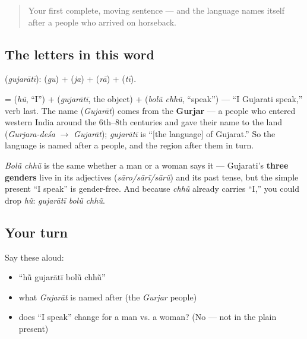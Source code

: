 \begin{quote}
Your first complete, moving sentence — and the language names itself after a people who arrived on horseback.
\end{quote}

\subsection*{The letters in this word}
\textbf{} (\emph{gujarātī}): \textbf{} (\emph{gu}) + \textbf{} (\emph{ja}) + \textbf{} (\emph{rā}) + \textbf{} (\emph{tī}).

\begin{cousinweb}
\textbf{   } = \textbf{} (\emph{hũ}, \textquotedblleft{}I\textquotedblright{}) + \textbf{} (\emph{gujarātī}, the object) + \textbf{ } (\emph{bolũ chhũ}, \textquotedblleft{}speak\textquotedblright{}) — \textquotedblleft{}I Gujarati speak,\textquotedblright{} verb last. The name \textbf{} (\emph{Gujarāt}) comes from the \textbf{Gurjar} — a people who entered western India around the 6th–8th centuries and gave their name to the land (\emph{Gurjara-deśa} $\to$ \emph{Gujarāt}); \emph{gujarātī} is \textquotedblleft{}{[}the language{]} of Gujarat.\textquotedblright{} So the language is named after a people, and the region after them in turn.
\end{cousinweb}

\begin{grammarlens}[title={Grammar Lens: no gender in the plain present}]
\emph{Bolũ chhũ} is the same whether a man or a woman says it — Gujarati's \textbf{three genders} live in its adjectives (\emph{sāro/sārī/sārũ}) and its past tense, but the simple present \textquotedblleft{}I speak\textquotedblright{} is gender-free. And because \emph{chhũ} already carries \textquotedblleft{}I,\textquotedblright{} you could drop \emph{hũ}: \emph{gujarātī bolũ chhũ}.
\end{grammarlens}

\subsection*{Your turn}
Say these aloud:

\begin{itemize}
\raggedright
  \item \textquotedblleft{}hũ gujarātī bolũ chhũ\textquotedblright{}
  \item what \emph{Gujarāt} is named after (the \emph{Gurjar} people)
  \item does \textquotedblleft{}I speak\textquotedblright{} change for a man vs. a woman? (No — not in the plain present)
\end{itemize}

